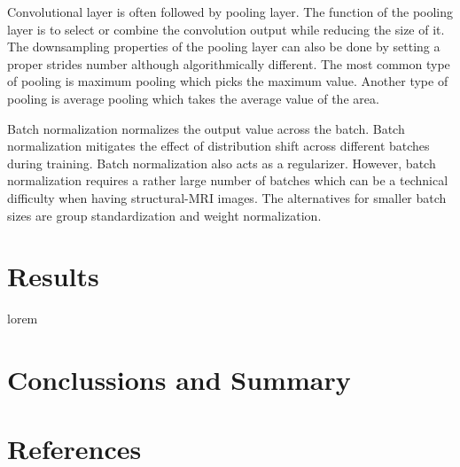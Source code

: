 \documentclass{article}
\begin{document}
    Convolutional layer is often followed by pooling layer. 
    The function of the pooling layer is to select or combine the convolution output while reducing the size of it. 
    The downsampling properties of the pooling layer can also be done by setting a proper strides number although algorithmically different. 
    The most common type of pooling is maximum pooling which picks the maximum value. 
    Another type of pooling is average pooling which takes the average value of the area. 

    Batch normalization normalizes the output value across the batch. 
    Batch normalization mitigates the effect of distribution shift across different batches during training. 
    Batch normalization also acts as a regularizer. 
    However, batch normalization requires a rather large number of batches which can be a technical difficulty when having structural-MRI images. 
    The alternatives for smaller batch sizes are group standardization and weight normalization.
    \section*{Results}
    lorem
    \section*{Conclussions and Summary}

    \section*{References}

    \printbibliography
\end{document}

